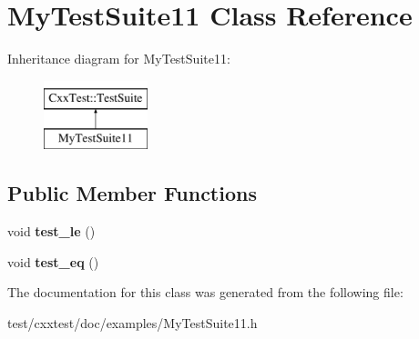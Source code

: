 \hypertarget{classMyTestSuite11}{\section{My\-Test\-Suite11 Class Reference}
\label{classMyTestSuite11}
}
Inheritance diagram for My\-Test\-Suite11\-:\begin{figure}[H]
\begin{center}
\leavevmode
\includegraphics[height=2.000000cm]{classMyTestSuite11}
\end{center}
\end{figure}
\subsection*{Public Member Functions}
\begin{DoxyCompactItemize}
\item 
\hypertarget{classMyTestSuite11_a572a90fc2e5575e88897b91e05992ff9}{void {\bfseries test\-\_\-le} ()}\label{classMyTestSuite11_a572a90fc2e5575e88897b91e05992ff9}

\item 
\hypertarget{classMyTestSuite11_add36497be924293dd54a27271ee601d2}{void {\bfseries test\-\_\-eq} ()}\label{classMyTestSuite11_add36497be924293dd54a27271ee601d2}

\end{DoxyCompactItemize}


The documentation for this class was generated from the following file\-:\begin{DoxyCompactItemize}
\item 
test/cxxtest/doc/examples/My\-Test\-Suite11.\-h\end{DoxyCompactItemize}
